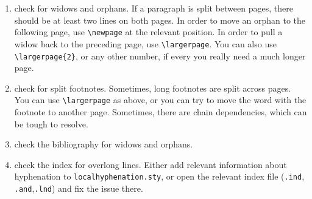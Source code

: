 \begin{enumerate}
\item check for widows and orphans. If a paragraph is split between pages, there should be at least two lines on both pages. In order to move  an orphan to the following page, use \verb+\newpage+ at the relevant position. In order to pull a widow back to the preceding page, use \verb+\largerpage+. You can also use \verb+\largerpage{2}+, or any other number, if every you really need a much longer page. \largerpage

\item check for split footnotes. Sometimes, long footnotes are split across pages. You can use \verb+\largerpage+ as above, or you can try to move the word with the footnote to another page. Sometimes, there are chain dependencies, which can be tough to resolve.
\item check the bibliography for widows and orphans. 
\item check the index for overlong lines. Either add relevant information about hyphenation to \verb+localhyphenation.sty+, or open the relevant index file (\verb+.ind+, \verb+.and+,\verb+.lnd+) and fix the issue there.  
\end{enumerate} 


